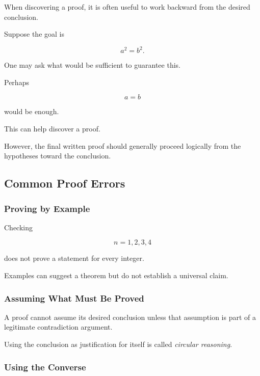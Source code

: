 When discovering a proof, it is often useful to work backward from the desired
conclusion.

Suppose the goal is

\[ a^2=b^2. \]

One may ask what would be sufficient to guarantee this.

Perhaps

\[ a=b \]

would be enough.

This can help discover a proof.

However, the final written proof should generally proceed logically from the
hypotheses toward the conclusion.

\subsection{Common Proof Errors}
\label{subsec:common-proof-errors}

\subsubsection{Proving by Example}

Checking

\[ n=1,2,3,4 \]

does not prove a statement for every integer.

Examples can suggest a theorem but do not establish a universal claim.

\subsubsection{Assuming What Must Be Proved}
\label{subsec:circular-proof}

A proof cannot assume its desired conclusion unless that assumption is part of
a legitimate contradiction argument.

Using the conclusion as justification for itself is called \emph{circular
reasoning}.

\subsubsection{Using the Converse}
\label{subsec:proof-error-converse}

